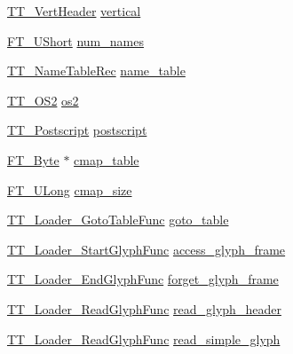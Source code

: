 \begin{DoxyCompactItemize}
\item 
\hyperlink{tttables_8h_a445e9be66f7f6b3980dc3be3049570ad}{T\-T\-\_\-\-Vert\-Header} \hyperlink{struct_t_t___face_rec___a04fc41d3860163177a7e0a9bcf71ccf4}{vertical}
\item 
\hyperlink{fttypes_8h_a937f6c17cf5ffd09086d8610c37b9f58}{F\-T\-\_\-\-U\-Short} \hyperlink{struct_t_t___face_rec___ae73033d211e0ac91396e6bb22d594fab}{num\-\_\-names}
\item 
\hyperlink{tttypes_8h_a56dbe23fc6daa260ecb783ef2dae1ba0}{T\-T\-\_\-\-Name\-Table\-Rec} \hyperlink{struct_t_t___face_rec___a33d114b43e6646893f15d39065b77e8c}{name\-\_\-table}
\item 
\hyperlink{tttables_8h_ab30cdb03683090c8336247bb86647fd6}{T\-T\-\_\-\-O\-S2} \hyperlink{struct_t_t___face_rec___a5371adcbd62ade9b74e5f24a03ef09f2}{os2}
\item 
\hyperlink{tttables_8h_aaeb91f004d8bedf03569aadac888c6ea}{T\-T\-\_\-\-Postscript} \hyperlink{struct_t_t___face_rec___a598bb9ada92970931585dc51878cf2cd}{postscript}
\item 
\hyperlink{fttypes_8h_a51f26183ca0c9f4af958939648caeccd}{F\-T\-\_\-\-Byte} $\ast$ \hyperlink{struct_t_t___face_rec___a07bfd99f7725a1fb5f27b44a126a46ba}{cmap\-\_\-table}
\item 
\hyperlink{fttypes_8h_a4fac88bdba78eb76b505efa6e4fbf3f5}{F\-T\-\_\-\-U\-Long} \hyperlink{struct_t_t___face_rec___a4d2e127541e4f223c0b6c5d5aca4c8c5}{cmap\-\_\-size}
\item 
\hyperlink{tttypes_8h_a89519914215a0605b354d0b20e32b1e3}{T\-T\-\_\-\-Loader\-\_\-\-Goto\-Table\-Func} \hyperlink{struct_t_t___face_rec___a3e2e3599abb7737179dbb2fbbd15355d}{goto\-\_\-table}
\item 
\hyperlink{tttypes_8h_acb2771f4819d5d5792673918165b57f4}{T\-T\-\_\-\-Loader\-\_\-\-Start\-Glyph\-Func} \hyperlink{struct_t_t___face_rec___a67cce5f4da277e6c8a47d8efe95bc58c}{access\-\_\-glyph\-\_\-frame}
\item 
\hyperlink{tttypes_8h_a4ea630e444513df98f946cffb5243598}{T\-T\-\_\-\-Loader\-\_\-\-End\-Glyph\-Func} \hyperlink{struct_t_t___face_rec___ac86fbd960fe6c919eb82cd7233655894}{forget\-\_\-glyph\-\_\-frame}
\item 
\hyperlink{tttypes_8h_abf2fb3b7aa78fb7f4c4a2c2b39dae0c5}{T\-T\-\_\-\-Loader\-\_\-\-Read\-Glyph\-Func} \hyperlink{struct_t_t___face_rec___a343db3c51a3047324fea455ac06d7cb3}{read\-\_\-glyph\-\_\-header}
\item 
\hyperlink{tttypes_8h_abf2fb3b7aa78fb7f4c4a2c2b39dae0c5}{T\-T\-\_\-\-Loader\-\_\-\-Read\-Glyph\-Func} \hyperlink{struct_t_t___face_rec___aa9f550ad4e10d8232cdd3427e02e7603}{read\-\_\-simple\-\_\-glyph}

\end{DoxyCompactItemize}
